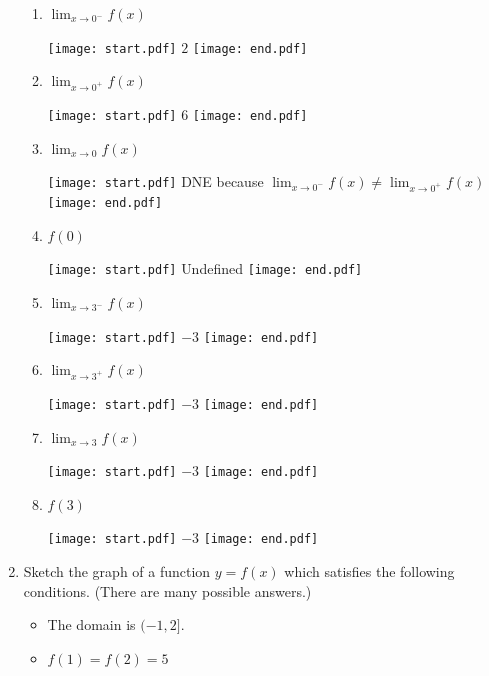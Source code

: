 \documentclass[12pt]{article}
\begin{document}
\begin{enumerate}
\begin{enumerate}

\item $\displaystyle \lim_{x \rightarrow 0^{-}}{f(x)}$

\texttt{[image: start.pdf]}
{{$2$}}
\texttt{[image: end.pdf]}


\item $\displaystyle \lim_{x \rightarrow 0^{+}}{f(x)}$

\texttt{[image: start.pdf]}
{{$6$}}
\texttt{[image: end.pdf]}


\item $\displaystyle \lim_{x \rightarrow 0}{f(x)}$

\texttt{[image: start.pdf]}
{{DNE because $\displaystyle \lim_{x \rightarrow 0^{-}}f(x) \neq \lim_{x \rightarrow 0^{+}}f(x)$}}
\texttt{[image: end.pdf]}


\item $f(0)$

\texttt{[image: start.pdf]}
{{Undefined}}
\texttt{[image: end.pdf]}


\item $\displaystyle \lim_{x \rightarrow 3^{-}}{f(x)}$

\texttt{[image: start.pdf]}
{{$-3$}}
\texttt{[image: end.pdf]}


\item $\displaystyle \lim_{x \rightarrow 3^{+}}{f(x)}$

\texttt{[image: start.pdf]}
{{$-3$}}
\texttt{[image: end.pdf]}


\item $\displaystyle \lim_{x \rightarrow 3}{f(x)}$

\texttt{[image: start.pdf]}
{{$-3$}}
\texttt{[image: end.pdf]}


\item $f(3)$

\texttt{[image: start.pdf]}
{{$-3$}}
\texttt{[image: end.pdf]}


\end{enumerate}

\newpage

\item Sketch the graph of a function $y=f(x)$ which satisfies the following conditions. (There are many possible answers.)

\begin{itemize}

\item The domain is $(-1,2]$.

\item $f(1)=f(2)=5$


\end{itemize}
\end{enumerate}
\end{document}
